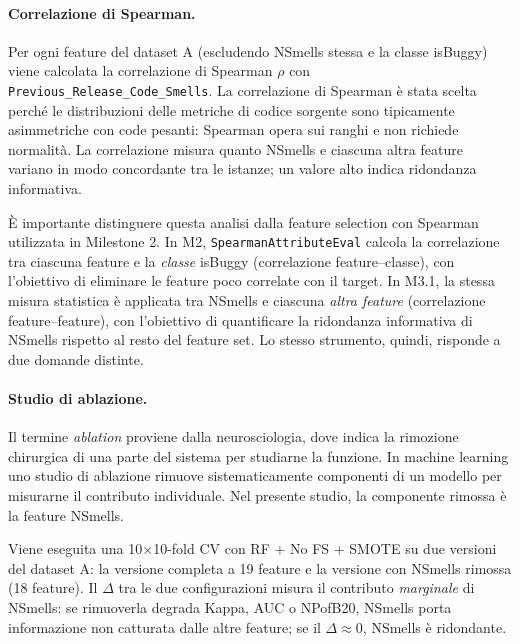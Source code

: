 \paragraph{Correlazione di Spearman.}
Per ogni feature del dataset A (escludendo NSmells stessa e la classe isBuggy) viene
calcolata la correlazione di Spearman $\rho$ con \texttt{Previous\_Release\_Code\_Smells}.
La correlazione di Spearman è stata scelta perché le distribuzioni delle metriche di codice
sorgente sono tipicamente asimmetriche con code pesanti: Spearman opera sui ranghi e non
richiede normalità. La correlazione misura quanto NSmells e ciascuna altra feature variano
in modo concordante tra le istanze; un valore alto indica ridondanza informativa.

È importante distinguere questa analisi dalla feature selection con Spearman utilizzata
in Milestone 2. In M2, \texttt{SpearmanAttributeEval} calcola la correlazione tra
ciascuna feature e la \textit{classe} isBuggy (correlazione feature--classe), con l'obiettivo
di eliminare le feature poco correlate con il target. In M3.1, la stessa misura statistica
è applicata tra NSmells e ciascuna \textit{altra feature} (correlazione feature--feature),
con l'obiettivo di quantificare la ridondanza informativa di NSmells rispetto al resto del
feature set. Lo stesso strumento, quindi, risponde a due domande distinte.

\paragraph{Studio di ablazione.}
Il termine \textit{ablation} proviene dalla neurosciologia, dove indica la rimozione
chirurgica di una parte del sistema per studiarne la funzione. In machine learning uno studio
di ablazione rimuove sistematicamente componenti di un modello per misurarne il contributo
individuale. Nel presente studio, la componente rimossa è la feature NSmells.

Viene eseguita una 10$\times$10-fold CV con RF + No FS + SMOTE su due versioni del
dataset A: la versione completa a 19 feature e la versione con NSmells rimossa (18 feature).
Il $\Delta$ tra le due configurazioni misura il contributo \textit{marginale} di NSmells: se
rimuoverla degrada Kappa, AUC o NPofB20, NSmells porta informazione non catturata dalle altre
feature; se il $\Delta \approx 0$, NSmells è ridondante.

